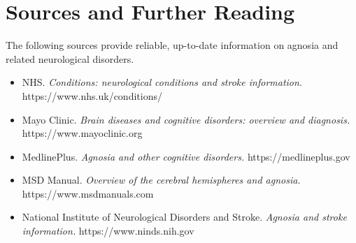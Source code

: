 \section*{Sources and Further Reading}
The following sources provide reliable, up-to-date information on agnosia and related neurological disorders.

\begin{itemize}
    \item NHS. \textit{Conditions: neurological conditions and stroke information.} https://www.nhs.uk/conditions/
    \item Mayo Clinic. \textit{Brain diseases and cognitive disorders: overview and diagnosis.} https://www.mayoclinic.org
    \item MedlinePlus. \textit{Agnosia and other cognitive disorders.} https://medlineplus.gov
    \item MSD Manual. \textit{Overview of the cerebral hemispheres and agnosia.} https://www.msdmanuals.com
    \item National Institute of Neurological Disorders and Stroke. \textit{Agnosia and stroke information.} https://www.ninds.nih.gov
\end{itemize}
